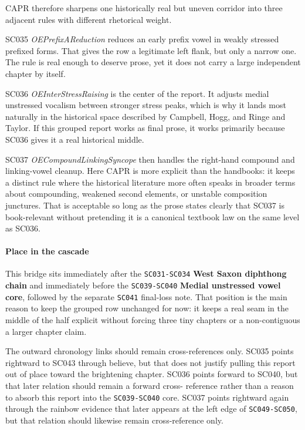 \documentclass[
  british,
  a4paper,
]{article}
\begin{document}
CAPR therefore sharpens one historically real but uneven corridor into
three adjacent rules with different rhetorical weight.

SC035 \emph{OEPrefixAReduction} reduces an early prefix vowel in weakly
stressed prefixed forms. That gives the row a legitimate left flank, but
only a narrow one. The rule is real enough to deserve prose, yet it does
not carry a large independent chapter by itself.

SC036 \emph{OEInterStressRaising} is the center of the report. It
adjusts medial unstressed vocalism between stronger stress peaks, which
is why it lands most naturally in the historical space described by
Campbell, Hogg, and Ringe and Taylor. If this grouped report works as
final prose, it works primarily because SC036 gives it a real historical
middle.

SC037 \emph{OECompoundLinkingSyncope} then handles the right-hand
compound and linking-vowel cleanup. Here CAPR is more explicit than the
handbooks: it keeps a distinct rule where the historical literature more
often speaks in broader terms about compounding, weakened second
elements, or unstable composition junctures. That is acceptable so long
as the prose states clearly that SC037 is book-relevant without
pretending it is a canonical textbook law on the same level as SC036.

\paragraph{Place in the cascade}\label{place-in-the-cascade-23}

This bridge sits immediately after the \texttt{SC031-SC034} \textbf{West
Saxon diphthong chain} and immediately before the \texttt{SC039-SC040}
\textbf{Medial unstressed vowel core}, followed by the separate
\texttt{SC041} final-loss note. That position is the main reason to keep
the grouped row unchanged for now: it keeps a real seam in the middle of
the half explicit without forcing three tiny chapters or a
non-contiguous a larger chapter claim.

The outward chronology links should remain cross-references only. SC035
points rightward to SC043 through believe, but that does not justify
pulling this report out of place toward the brightening chapter. SC036
points forward to SC040, but that later relation should remain a forward
cross- reference rather than a reason to absorb this report into the
\texttt{SC039-SC040} core. SC037 points rightward again through the
rainbow evidence that later appears at the left edge of
\texttt{SC049-SC050}, but that relation should likewise remain
cross-reference only.
\end{document}
